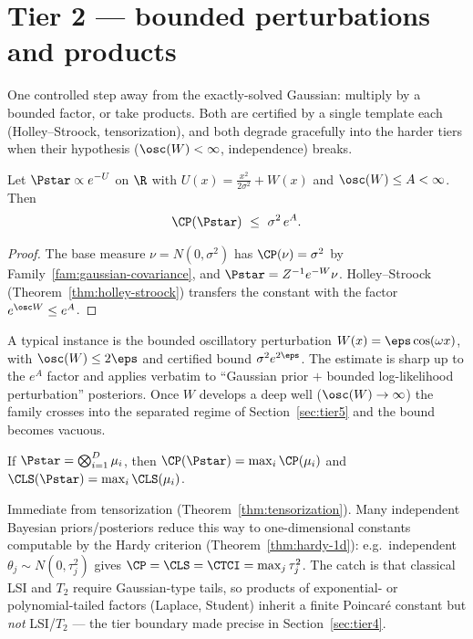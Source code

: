 \documentclass[../main.tex]{subfiles}
\begin{document}
\section{Tier 2 --- bounded perturbations and products}
\label{sec:tier2}

One controlled step away from the exactly-solved Gaussian: multiply by a bounded factor, or
take products. Both are certified by a single template each (Holley--Stroock,
tensorization), and both degrade gracefully into the harder tiers when their hypothesis
($\osc(W)<\infty$, independence) breaks.

\begin{family}
\label{fam:perturbed-gaussian-1d}
Let $\Pstar\propto e^{-U}$ on $\R$ with $U(x)=\tfrac{x^2}{2\sigma^2}+W(x)$ and
$\osc(W)\le A<\infty$. Then
\[
  \CP(\Pstar)\ \le\ \sigma^2\,e^{A}.
\]
\end{family}

\begin{proof}
The base measure $\nu=N(0,\sigma^2)$ has $\CP(\nu)=\sigma^2$ by
Family~\ref{fam:gaussian-covariance}, and $\Pstar=Z^{-1}e^{-W}\nu$. Holley--Stroock
(Theorem~\ref{thm:holley-stroock}) transfers the constant with the factor
$e^{\osc W}\le e^{A}$.
\end{proof}

\noindent A typical instance is the bounded oscillatory perturbation $W(x)=\eps\cos(\omega x)$,
with $\osc(W)\le2\eps$ and certified bound $\sigma^2 e^{2\eps}$. The estimate is sharp up to
the $e^{A}$ factor and applies verbatim to ``Gaussian prior $+$ bounded log-likelihood
perturbation'' posteriors. Once $W$ develops a deep well ($\osc(W)\to\infty$) the family
crosses into the separated regime of Section~\ref{sec:tier5} and the bound becomes vacuous.

\begin{family}
\label{fam:products}
If $\Pstar=\bigotimes_{i=1}^D\mu_i$, then $\CP(\Pstar)=\max_i\CP(\mu_i)$ and
$\CLS(\Pstar)=\max_i\CLS(\mu_i)$.
\end{family}

\noindent Immediate from tensorization (Theorem~\ref{thm:tensorization}). Many independent
Bayesian priors/posteriors reduce this way to one-dimensional constants computable by the
Hardy criterion (Theorem~\ref{thm:hardy-1d}): e.g.\ independent
$\theta_j\sim N(0,\tau_j^2)$ gives $\CP=\CLS=\CTCI=\max_j\tau_j^2$. The catch is that
classical LSI and $T_2$ require Gaussian-type tails, so products of exponential- or
polynomial-tailed factors (Laplace, Student) inherit a finite Poincar\'e constant but
\emph{not} LSI/$T_2$ --- the tier boundary made precise in Section~\ref{sec:tier4}.
\end{document}
